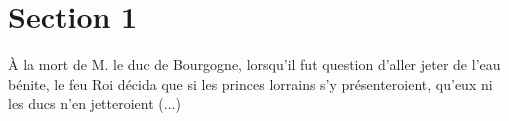 \documentclass{article}
\begin{document}
\section{Section 1}



\`A la mort de M. le \gls{duc} de Bourgogne, lorsqu'il fut question d'aller jeter de l'eau b\'enite, le feu Roi d\'ecida que si les princes lorrains s'y pr\'esenteroient, qu'eux ni les \gls{ducs} n'en jetteroient (...)





\printindex

\printglossaries
\end{document}
